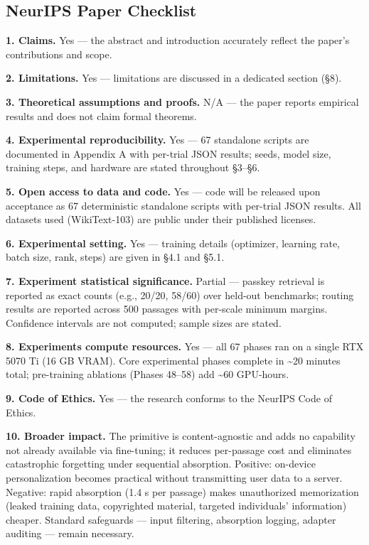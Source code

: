 \subsection{NeurIPS Paper Checklist}\label{neurips-paper-checklist}

\textbf{1. Claims.} Yes --- the abstract and introduction accurately reflect the paper's contributions and scope.

\textbf{2. Limitations.} Yes --- limitations are discussed in a dedicated section (§8).

\textbf{3. Theoretical assumptions and proofs.} N/A --- the paper reports empirical results and does not claim formal theorems.

\textbf{4. Experimental reproducibility.} Yes --- 67 standalone scripts are documented in Appendix A with per-trial JSON results; seeds, model size, training steps, and hardware are stated throughout §3--§6.

\textbf{5. Open access to data and code.} Yes --- code will be released upon acceptance as 67 deterministic standalone scripts with per-trial JSON results. All datasets used (WikiText-103) are public under their published licenses.

\textbf{6. Experimental setting.} Yes --- training details (optimizer, learning rate, batch size, rank, steps) are given in §4.1 and §5.1.

\textbf{7. Experiment statistical significance.} Partial --- passkey retrieval is reported as exact counts (e.g., 20/20, 58/60) over held-out benchmarks; routing results are reported across 500 passages with per-scale minimum margins. Confidence intervals are not computed; sample sizes are stated.

\textbf{8. Experiments compute resources.} Yes --- all 67 phases ran on a single RTX 5070 Ti (16 GB VRAM). Core experimental phases complete in \textasciitilde20 minutes total; pre-training ablations (Phases 48--58) add \textasciitilde60 GPU-hours.

\textbf{9. Code of Ethics.} Yes --- the research conforms to the NeurIPS Code of Ethics.

\textbf{10. Broader impact.} The primitive is content-agnostic and adds no capability not already available via fine-tuning; it reduces per-passage cost and eliminates catastrophic forgetting under sequential absorption. Positive: on-device personalization becomes practical without transmitting user data to a server. Negative: rapid absorption (1.4 s per passage) makes unauthorized memorization (leaked training data, copyrighted material, targeted individuals' information) cheaper. Standard safeguards --- input filtering, absorption logging, adapter auditing --- remain necessary.

